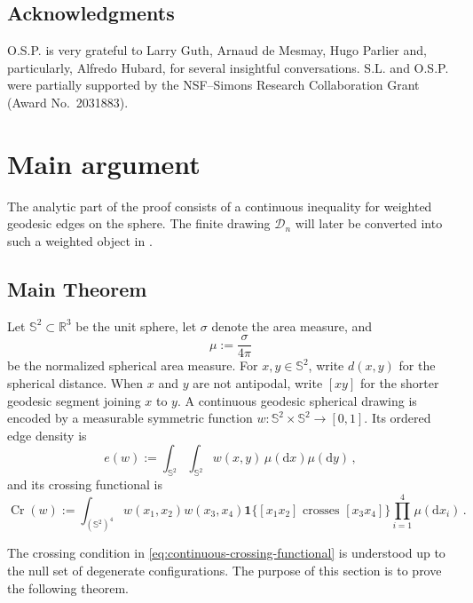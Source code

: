 \documentclass[reqno, 11pt]{amsart}
\theoremstyle{definition}
\newcommand{\dd}{\mathrm{d}}
\newcommand{\II}[1]{\mathbf{1}{#1}}
\begin{document}
\subsection*{Acknowledgments}
O.S.P. is very grateful to Larry Guth, Arnaud de Mesmay, Hugo Parlier and, particularly, Alfredo Hubard, for several insightful conversations. S.L. and O.S.P. were partially supported by the NSF–Simons Research Collaboration Grant (Award No.~2031883).

\section{Main argument}\label{sec:main}

The analytic part of the proof consists of a continuous inequality for weighted geodesic edges on the sphere.  The finite drawing \({\mathcal D}_n\) will later be converted into such a weighted object in .

\subsection{Main Theorem}\label{subsec:main-setup}
Let \({\mathbb S}^2\subset{\mathbb R}^3\) be the unit sphere, let \(\sigma\) denote the area measure, and
\[
        \mu:=\frac{\sigma}{4\pi}
\]
be the normalized spherical area measure.  For \(x,y\in{\mathbb S}^2\), write \(d(x,y)\) for the spherical distance.  When $x$ and $y$ are not antipodal, write \([xy]\) for the shorter geodesic segment joining \(x\) to \(y\).  A continuous geodesic spherical drawing is encoded by a measurable symmetric function $w:{\mathbb S}^2\times{\mathbb S}^2\longrightarrow[0,1]$. Its ordered edge density is
\begin{equation}\label{eq:continuous-density}
        e(w):=
        \int_{{\mathbb S}^2}\int_{{\mathbb S}^2}w(x,y)\,\mu(\dd x)\mu(\dd y)\,,
\end{equation}
and its crossing functional is
\begin{equation}\label{eq:continuous-crossing-functional}
        \operatorname{Cr}(w):=
        \int_{({\mathbb S}^2)^4}
        w(x_1,x_2)w(x_3,x_4)
        \II{\{[x_1x_2]\text{ crosses }[x_3x_4]\}}
        \prod_{i=1}^4\mu(\dd x_i)\,.
\end{equation}

The crossing condition in \eqref{eq:continuous-crossing-functional} is understood up to the null set of degenerate configurations. The purpose of this section is to prove the following theorem.
\end{document}
